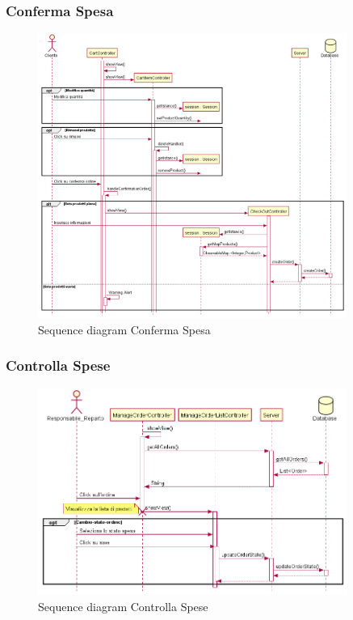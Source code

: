 \documentclass[12pt, a4paper]{report}
\begin{document}
\newpage

\subsubsection{Conferma Spesa}

\begin{figure}[h]
  \centering
  \includegraphics[width=0.9\textwidth]{sequence_conferma_spesa.png}
  \caption{Sequence diagram Conferma Spesa}
\end{figure}

\newpage

\subsubsection{Controlla Spese}

\begin{figure}[h]
  \centering
  \includegraphics[width=0.9\textwidth]{sequence_controllo_spese.png}
  \caption{Sequence diagram Controlla Spese}
\end{figure}
\end{document}
